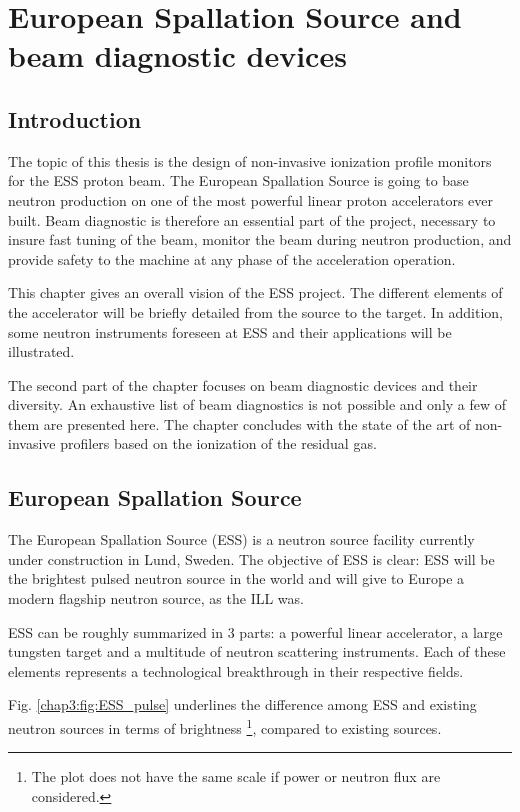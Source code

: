 \chapter{European Spallation Source and beam diagnostic devices}
\cleardoublepage

\minitoc
\section{Introduction}
\begin{refsection}
  \label{ch2:Introduction}
  The topic of this thesis is the design of non-invasive ionization profile monitors for the ESS proton beam. The European Spallation Source is going to base neutron production on one of the most powerful linear proton accelerators ever built. Beam diagnostic is therefore an essential part of the project, necessary to insure fast tuning of the beam, monitor the beam during neutron production, and provide safety to the machine at any phase of the acceleration operation.

  This chapter gives an overall vision of the ESS project. The different elements of the accelerator will be briefly detailed from the source to the target. In addition, some neutron instruments foreseen at ESS and their applications will be illustrated.

  The second part of the chapter focuses on beam diagnostic devices and their diversity. An exhaustive list of beam diagnostics is not possible and only a few of them are presented here. The chapter concludes with the state of the art of non-invasive profilers based on the ionization of the residual gas.

  \section{European Spallation Source}
  The European Spallation Source (ESS) is a neutron source facility currently under construction in Lund, Sweden. The objective of ESS is clear: ESS will be the brightest pulsed neutron source in the world and will give to Europe a modern flagship neutron source, as the ILL was.

  ESS can be roughly summarized in 3 parts: a powerful linear accelerator, a large tungsten target and a multitude of neutron scattering instruments. Each of these elements represents a technological breakthrough in their respective fields.

  Fig. \ref{chap3:fig:ESS_pulse} underlines the difference among ESS and existing neutron sources in terms of brightness \footnote{The plot does not have the same scale if power or neutron flux are considered.}, compared to existing sources.
  
  

\end{refsection}
